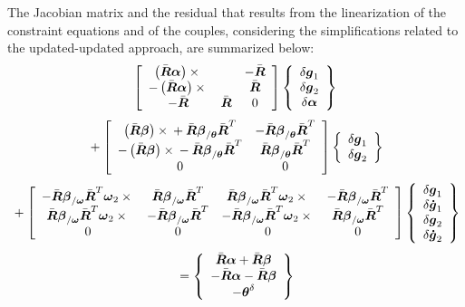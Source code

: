 \documentclass[10pt,dvips]{report}
\newcommand{\T}[1]{\boldsymbol{#1}}
\begin{document}
\noindent
The Jacobian matrix and the residual that results from the linearization
of the constraint equations and of the couples, considering
the simplifications related to the updated-updated approach,
are summarized below:
\begin{displaymath}
	\sqbr{\matr{ccc}{
	\plbr{\bar{\T{R}}\T{\alpha}}\times{} & & - \bar{\T{R}} \\
	- \plbr{\bar{\T{R}}\T{\alpha}}\times{} & & \bar{\T{R}} \\
	- \bar{\T{R}} & \bar{\T{R}} & 0
	}}\cubr{\cvvect{
		\delta\T{g}_1 \\
		\delta\T{g}_2 \\
		\delta\T{\alpha} \\
	}}
\end{displaymath}
\begin{displaymath}
	\mbox{} + \sqbr{\matr{cc}{
	\plbr{\bar{\T{R}}\T{\beta}}\times{} 
		+ \bar{\T{R}}\T{\beta}_{/\T{\theta}}\bar{\T{R}}^T &
		- \bar{\T{R}}\T{\beta}_{/\T{\theta}}\bar{\T{R}}^T \\
	- \plbr{\bar{\T{R}}\T{\beta}}\times{}
		- \bar{\T{R}}\T{\beta}_{/\T{\theta}}\bar{\T{R}}^T &
		\bar{\T{R}}\T{\beta}_{/\T{\theta}}\bar{\T{R}}^T \\
	0 & 0 
	}}\cubr{\cvvect{
		\delta\T{g}_1 \\
		\delta\T{g}_2 \\
	}}
\end{displaymath}
\begin{displaymath}
 	\mbox{} + \sqbr{\matr{cccc}{
		- \bar{\T{R}}\T{\beta}_{/\T{\omega}}\bar{\T{R}}^T\T{\omega}_2\times{} &
		\bar{\T{R}}\T{\beta}_{/\T{\omega}}\bar{\T{R}}^T &
		\bar{\T{R}}\T{\beta}_{/\T{\omega}}\bar{\T{R}}^T\T{\omega}_2\times{} &
		- \bar{\T{R}}\T{\beta}_{/\T{\omega}}\bar{\T{R}}^T \\
		\bar{\T{R}}\T{\beta}_{/\T{\omega}}\bar{\T{R}}^T\T{\omega}_2\times{} &
		- \bar{\T{R}}\T{\beta}_{/\T{\omega}}\bar{\T{R}}^T &
		- \bar{\T{R}}\T{\beta}_{/\T{\omega}}\bar{\T{R}}^T\T{\omega}_2\times{} &
		\bar{\T{R}}\T{\beta}_{/\T{\omega}}\bar{\T{R}}^T \\
	0 & 0 & 0 & 0
	}}\cubr{\cvvect{
		\delta\T{g}_1 \\
		\delta\T{\dot{g}}_1 \\
		\delta\T{g}_2 \\
		\delta\T{\dot{g}}_2 \\
	}}
\end{displaymath}
\begin{displaymath}
 	\mbox{} = \cubr{\cvvect{
		\bar{\T{R}} \T{\alpha} + \bar{\T{R}} \T{\beta} \\
		- \bar{\T{R}} \T{\alpha} - \bar{\T{R}} \T{\beta} \\
		- \T{\theta}^{\delta}
	}}
\end{displaymath}
\end{document}
